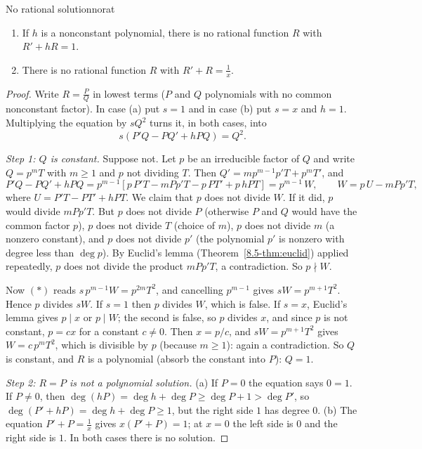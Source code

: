 \documentclass[11pt]{article}
\begin{document}
\begin{thm}{No rational solution}{norat}
\begin{enumerate}[label=(\alph*)]
  \item If $h$ is a nonconstant polynomial, there is no rational function $R$ with $R'+hR=1$.
  \item There is no rational function $R$ with $R'+R=\frac1x$.
\end{enumerate}
\end{thm}
\begin{proof}
Write $R=\frac PQ$ in lowest terms ($P$ and $Q$ polynomials with no common nonconstant factor). In case (a) put $s=1$ and in case (b) put $s=x$ and $h=1$. Multiplying the equation by $sQ^2$ turns it, in both cases, into
\[s\left(P'Q-PQ'+hPQ\right)=Q^2 .\tag{$*$}\]

\emph{Step 1: $Q$ is constant.} Suppose not. Let $p$ be an irreducible factor of $Q$ and write $Q=p^mT$ with $m\ge1$ and $p$ not dividing $T$. Then $Q'=mp^{m-1}p'T+p^mT'$, and
\[P'Q-PQ'+hPQ=p^{m-1}\left[p\,P'T-mPp'T-p\,PT'+p\,hPT\right]=p^{m-1}\,W,\qquad W=p\,U-mPp'T,\]
where $U=P'T-PT'+hPT$. We claim that $p$ does not divide $W$. If it did, $p$ would divide $mPp'T$. But $p$ does not divide $P$ (otherwise $P$ and $Q$ would have the common factor $p$), $p$ does not divide $T$ (choice of $m$), $p$ does not divide $m$ (a nonzero constant), and $p$ does not divide $p'$ (the polynomial $p'$ is nonzero with degree less than $\deg p$). By Euclid's lemma (Theorem~\ref{8.5-thm:euclid}) applied repeatedly, $p$ does not divide the product $mPp'T$, a contradiction. So $p\nmid W$.

Now $(*)$ reads $s\,p^{m-1}W=p^{2m}T^2$, and cancelling $p^{m-1}$ gives $sW=p^{m+1}T^2$. Hence $p$ divides $sW$. If $s=1$ then $p$ divides $W$, which is false. If $s=x$, Euclid's lemma gives $p\mid x$ or $p\mid W$; the second is false, so $p$ divides $x$, and since $p$ is not constant, $p=cx$ for a constant $c\ne0$. Then $x=p/c$, and $sW=p^{m+1}T^2$ gives $W=c\,p^mT^2$, which is divisible by $p$ (because $m\ge1$): again a contradiction. So $Q$ is constant, and $R$ is a polynomial (absorb the constant into $P$): $Q=1$.

\emph{Step 2: $R=P$ is not a polynomial solution.} (a) If $P=0$ the equation says $0=1$. If $P\ne0$, then $\deg(hP)=\deg h+\deg P\ge\deg P+1>\deg P'$, so $\deg\left(P'+hP\right)=\deg h+\deg P\ge1$, but the right side $1$ has degree $0$. (b) The equation $P'+P=\frac1x$ gives $x\left(P'+P\right)=1$; at $x=0$ the left side is $0$ and the right side is $1$. In both cases there is no solution.
\end{proof}
\end{document}
